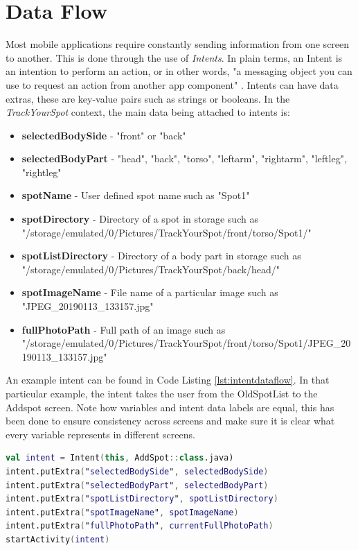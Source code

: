 \section{Data Flow}
Most mobile applications require constantly sending information from one screen to another. This is done through the use of \emph{Intents}. In plain terms, an Intent is an intention to perform an action, or in other words, "a messaging object you can use to request an action from another app component" \cite{intents}. Intents can have data extras, these are key-value pairs such as strings or booleans. In the \emph{TrackYourSpot} context, the main data being attached to intents is:
\begin{itemize}
    \item \textbf{selectedBodySide} - "front" or "back"
    \item \textbf{selectedBodyPart} - "head", "back", "torso", "leftarm", "rightarm", "leftleg", "rightleg"
    \item \textbf{spotName} - User defined spot name such as "Spot1"
    \item \textbf{spotDirectory} - Directory of a spot in storage such as "/storage/emulated/0/Pictures/TrackYourSpot/front/torso/Spot1/"
    \item \textbf{spotListDirectory} - Directory of a body part in storage such as "/storage/emulated/0/Pictures/TrackYourSpot/back/head/"
    \item \textbf{spotImageName} - File name of a particular image such as "JPEG\_20190113\_133157.jpg"
    \item \textbf{fullPhotoPath} - Full path of an image such as "/storage/emulated/0/Pictures/TrackYourSpot/front/torso/Spot1/JPEG\_20190113\_133157.jpg"
\end{itemize}
An example intent can be found in Code Listing \ref{lst:intentdataflow}. In that particular example, the intent takes the user from the OldSpotList to the Addspot screen. Note how variables and intent data labels are equal, this has been done to ensure consistency across screens and make sure it is clear what every variable represents in different screens.

\begin{lstlisting}[caption={Intent Dataflow for the AddSpot class}, 
label={lst:intentdataflow}, language=Kotlin]
val intent = Intent(this, AddSpot::class.java)
intent.putExtra("selectedBodySide", selectedBodySide)
intent.putExtra("selectedBodyPart", selectedBodyPart)
intent.putExtra("spotListDirectory", spotListDirectory)
intent.putExtra("spotImageName", spotImageName)
intent.putExtra("fullPhotoPath", currentFullPhotoPath)
startActivity(intent)
\end{lstlisting}
